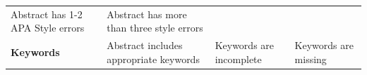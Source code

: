 \documentclass[
  openany]{book}
\begin{document}
\begin{longtable}[]{@{}llll@{}}
\begin{minipage}[t]{0.22\columnwidth}
Abstract has 1-2 APA Style errors\strut
\end{minipage} & \begin{minipage}[t]{0.22\columnwidth}\raggedright
Abstract has more than three style errors\strut
\end{minipage}\tabularnewline
\begin{minipage}[t]{0.22\columnwidth}\raggedright
\textbf{Keywords}\strut
\end{minipage} & \begin{minipage}[t]{0.22\columnwidth}\raggedright
Abstract includes appropriate keywords\strut
\end{minipage} & \begin{minipage}[t]{0.22\columnwidth}\raggedright
Keywords are incomplete\strut
\end{minipage} & \begin{minipage}[t]{0.22\columnwidth}\raggedright
Keywords are missing\strut
\end{minipage}\tabularnewline
\bottomrule
\end{longtable}
\end{document}
